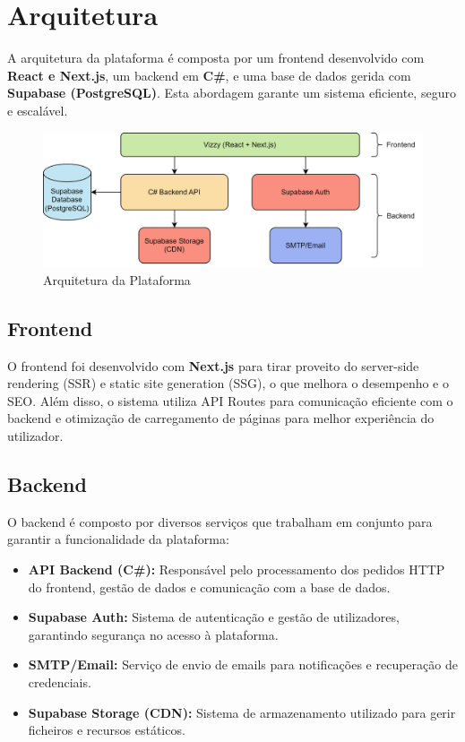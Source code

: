 \documentclass[a4paper, 12pt]{article} %
\begin{document}
\section{Arquitetura}
A arquitetura da plataforma é composta por um frontend desenvolvido com \textbf{React e Next.js}, um backend em \textbf{C\#}, e uma base de dados gerida com \textbf{Supabase (PostgreSQL)}. Esta abordagem garante um sistema eficiente, seguro e escalável.

\begin{figure}[ht]
	\centering
	\includegraphics[width=\textwidth]{../images/system-architecture.png}
	\caption{Arquitetura da Plataforma}
	\label{fig:arquitetura}
\end{figure}

\subsection{Frontend}
O frontend foi desenvolvido com \textbf{Next.js} para tirar proveito do server-side rendering (SSR) e static site generation (SSG), o que melhora o desempenho e o SEO. Além disso, o sistema utiliza API Routes para comunicação eficiente com o backend e otimização de carregamento de páginas para melhor experiência do utilizador.

\subsection{Backend}
O backend é composto por diversos serviços que trabalham em conjunto para garantir a funcionalidade da plataforma:

\begin{itemize}
	\item \textbf{API Backend (C\#):} Responsável pelo processamento dos pedidos HTTP do frontend, gestão de dados e comunicação com a base de dados.
	\item \textbf{Supabase Auth:} Sistema de autenticação e gestão de utilizadores, garantindo segurança no acesso à plataforma.
	\item \textbf{SMTP/Email:} Serviço de envio de emails para notificações e recuperação de credenciais.
	\item \textbf{Supabase Storage (CDN):} Sistema de armazenamento utilizado para gerir ficheiros e recursos estáticos.
\end{itemize}
\end{document}
